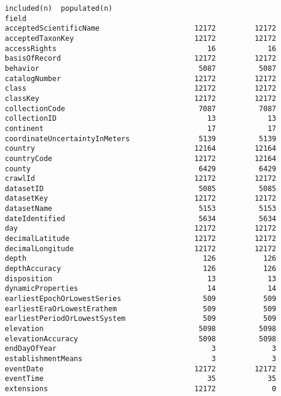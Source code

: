\documentclass[11pt]{article}
\begin{document}
    \begin{Verbatim}[commandchars=\\\{\}]
                                      included(n)  populated(n)
field                                                          
acceptedScientificName                      12172         12172
acceptedTaxonKey                            12172         12172
accessRights                                   16            16
basisOfRecord                               12172         12172
behavior                                     5087          5087
catalogNumber                               12172         12172
class                                       12172         12172
classKey                                    12172         12172
collectionCode                               7087          7087
collectionID                                   13            13
continent                                      17            17
coordinateUncertaintyInMeters                5139          5139
country                                     12164         12164
countryCode                                 12172         12164
county                                       6429          6429
crawlId                                     12172         12172
datasetID                                    5085          5085
datasetKey                                  12172         12172
datasetName                                  5153          5153
dateIdentified                               5634          5634
day                                         12172         12172
decimalLatitude                             12172         12172
decimalLongitude                            12172         12172
depth                                         126           126
depthAccuracy                                 126           126
disposition                                    13            13
dynamicProperties                              14            14
earliestEpochOrLowestSeries                   509           509
earliestEraOrLowestErathem                    509           509
earliestPeriodOrLowestSystem                  509           509
elevation                                    5098          5098
elevationAccuracy                            5098          5098
endDayOfYear                                    3             3
establishmentMeans                              3             3
eventDate                                   12172         12172
eventTime                                      35            35
extensions                                  12172             0

\end{Verbatim}
\end{document}
